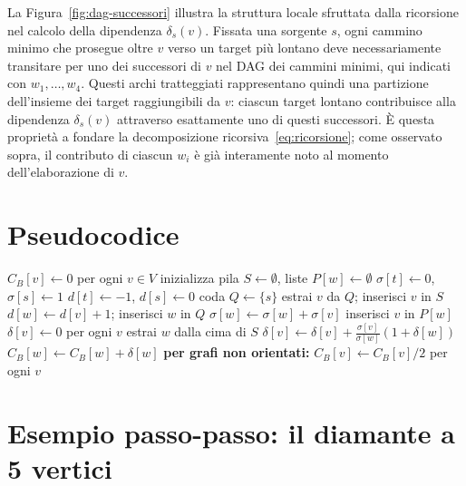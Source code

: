 \documentclass[11pt,a4paper]{report}
\begin{document}
La Figura~\ref{fig:dag-successori} illustra la struttura locale sfruttata dalla
ricorsione nel calcolo della dipendenza $\delta_s(v)$. Fissata una sorgente $s$,
ogni cammino minimo che prosegue oltre $v$ verso un target più lontano deve
necessariamente transitare per uno dei successori di $v$ nel DAG dei cammini
minimi, qui indicati con $w_1,\dots,w_4$. Questi archi tratteggiati rappresentano
quindi una partizione dell'insieme dei target raggiungibili da $v$: ciascun target
lontano contribuisce alla dipendenza $\delta_s(v)$ attraverso esattamente uno di
questi successori. È questa proprietà a fondare la decomposizione
ricorsiva~\eqref{eq:ricorsione}; come osservato sopra, il contributo di ciascun
$w_i$ è già interamente noto al momento dell'elaborazione di $v$.

\clearpage
\section{Pseudocodice}

\begin{algorithm}[H]
	\caption{Betweenness centrality (Brandes, grafi non pesati)}
	\begin{algorithmic}[1]
		\State $C_B[v]\gets 0$ per ogni $v\in V$
		\State inizializza pila $S\gets\emptyset$, liste $P[w]\gets\emptyset$
		\State $\sigma[t]\gets 0$, $\sigma[s]\gets 1$
		\State $d[t]\gets -1$, $d[s]\gets 0$
		\State coda $Q\gets\{s\}$
		 
		\State estrai $v$ da $Q$; inserisci $v$ in $S$
		 
		\State $d[w]\gets d[v]+1$; inserisci $w$ in $Q$
		\EndIf
		 
		\State $\sigma[w]\gets\sigma[w]+\sigma[v]$
		\State inserisci $v$ in $P[w]$
		\EndIf
		\EndFor
		\EndWhile
		\State $\delta[v]\gets 0$ per ogni $v$
		 
		\State estrai $w$ dalla cima di $S$
		\State $\delta[v]\gets\delta[v]+\frac{\sigma[v]}{\sigma[w]}(1+\delta[w])$
		\EndFor
		 $C_B[w]\gets C_B[w]+\delta[w]$ \EndIf
		\EndWhile
		\EndFor
		\State \textbf{per grafi non orientati:} $C_B[v]\gets C_B[v]/2$ per ogni $v$
	\end{algorithmic}
\end{algorithm}

\section{Esempio passo-passo: il diamante a 5 vertici}
\end{document}
